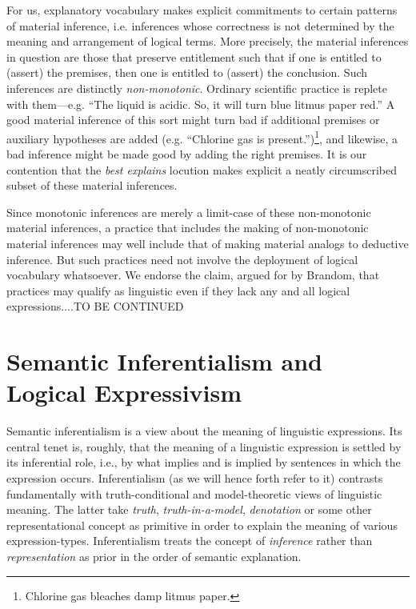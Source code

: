 \documentclass{article}
\begin{document}
For us, explanatory vocabulary makes explicit commitments to certain patterns of material inference, i.e. inferences whose correctness is not determined by the meaning and arrangement of logical terms. More precisely, the material inferences in question are those that preserve entitlement such that if one is entitled to (assert) the premises, then one is entitled to (assert) the conclusion. Such inferences are distinctly \textit{non-monotonic}. Ordinary scientific practice is replete with them---e.g. ``The liquid is acidic. So, it will turn blue litmus paper red.'' A good material inference of this sort might turn bad if additional premises or auxiliary hypotheses are added (e.g. ``Chlorine gas is present.'')\footnote{Chlorine gas bleaches damp litmus paper.}, and likewise, a bad inference might be made good by adding the right premises. It is our contention that the \textit{best explains} locution makes explicit a neatly circumscribed subset of these material inferences. 

Since monotonic inferences are merely a limit-case of these non-monotonic material inferences, a practice that includes the making of non-monotonic material inferences may well include that of making material analogs to deductive inference. But such practices need not involve the deployment of logical vocabulary whatsoever. We endorse the claim, argued for by Brandom, that practices may qualify as linguistic even if they lack any and all logical expressions....TO BE CONTINUED






\newpage

\section{Semantic Inferentialism and Logical Expressivism}


Semantic inferentialism is a view about the meaning of linguistic expressions. Its central tenet is, roughly, that the meaning of a linguistic expression is settled by its inferential role, i.e., by what implies and is implied by sentences in which the expression occurs. Inferentialism (as we will hence forth refer to it) contrasts fundamentally with truth-conditional and model-theoretic views of linguistic meaning. The latter take \textit{truth}, \textit{truth-in-a-model}, \textit{denotation} or some other representational concept as primitive in order to explain the meaning of various expression-types. Inferentialism treats the concept of \textit{inference} rather than \textit{representation} as prior in the order of semantic explanation.
\end{document}
